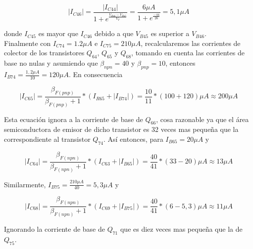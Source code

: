 \documentclass[12pt,a4paper,final,headinclude,footinclude,BCOR5mm]{scrartcl}
\begin{document}
$$|I_{C46}| = \frac{|I_{C44}|}{1 + e^{\frac{V_{B46}-V_{B45}}{V_{T}}}} = \frac{6 \mu A}{1 + e^{\frac{-44}{26}}} = 5,1 \mu A$$

donde $I_{C45}$ es mayor que $I_{C46}$ debido a que $V_{B45}$ es superior a $V_{B46}$.\\ 

Finalmente con $I_{C74} = 1.2 \mu A$ e $I_{C75} = 210 \mu A$, recalcularemos las corrientes de colector de los transistores $Q_{64}$, $Q_{65}$ y $Q_{68}$, tomando en cuenta las corrientes de base no nulas y asumiendo que $\beta_{npn} = 40$ y $\beta_{pnp} =  10$, entonces $I_{B74} = \frac{1,2 \mu A}{10} = 120 \mu A$. En consecuencia

$$|I_{C65}| = \frac{\beta_{F(pnp)}}{\beta_{F(pnp)} + 1} * (I_{R65} + |I_{B74}|) = \frac{10}{11} * (100 + 120) \mu A \approx 200 \mu A$$

Esta ecuación ignora a la corriente de base de $Q_{66}$, cosa razonable ya que el área semiconductora de emisor de dicho transistor es 32 veces mas pequeña que la correspondiente al transistor $Q_{74}$. Así entonces, para $I_{B65} = 20 \mu A$ y

$$|I_{C64}| = \frac{\beta_{F(npn)}}{\beta_{F(npn)} + 1} * (I_{C63} + |I_{B65}|) = \frac{40}{41} * (33 - 20) \mu A \approx 13 \mu A$$

Similarmente, $I_{B75} = \frac{210 \mu A}{40} =  5,3 \mu A$ y

$$|I_{C68}| = \frac{\beta_{F(npn)}}{\beta_{F(npn)} + 1} * (I_{C69} + |I_{B75}|) = \frac{40}{41} * (6 - 5,3) \mu A \approx 11 \mu A$$

Ignorando la corriente de base de $Q_{71}$ que es diez veces mas pequeña que la de $Q_{75}$.\\
\end{document}
